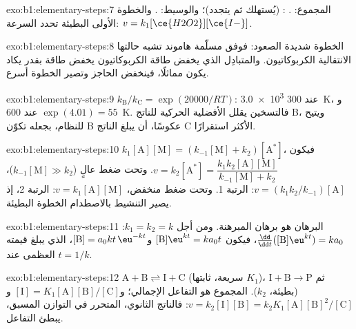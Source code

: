 \begin{solution}{exo:b1:elementary-steps:7}
المجموع: . :  (يُستهلك ثم
يتجدد)؛ والوسيط: . والخطوة الأولى البطيئة تحدد
السرعة: $v = k_1[\ce{H2O2}][\ce{I-}]$.
\end{solution}

\begin{solution}{exo:b1:elementary-steps:8}
الخطوة شديدة الصعود: فوفق مسلّمة هاموند تشبه حالتها الانتقالية
الكربوكاتيون. والمتبادِل الذي يخفض طاقة
الكربوكاتيون يخفض طاقة  بقدر يكاد يكون مماثلًا،
فينخفض الحاجز وتصير الخطوة أسرع.
\end{solution}

\begin{solution}{exo:b1:elementary-steps:9}
$k_{\mathrm B}/k_{\mathrm C} = \exp(20000/RT)$: \num{3.0e3} عند \qty{300}{K}،
و$\exp(4.01) = 55$ عند \qty{600}{K}. فالتسخين يقلل الأفضلية الحركية
للناتج B، ويتيح للنظام، بجعله تكوّن B عكوسًا، أن يبلغ
الناتج C الأكثر استقرارًا.
\end{solution}

\begin{solution}{exo:b1:elementary-steps:10}
$k_1[\mathrm{A}][\mathrm{M}] = (k_{-1}[\mathrm{M}] + k_2)[\mathrm{A}^*]$،
فيكون $v = k_2[\mathrm{A}^*] = \dfrac{k_1k_2[\mathrm{A}][\mathrm{M}]}{k_{-1}[\mathrm{M}]
+ k_2}$. وتحت ضغط عالٍ ($k_{-1}[\mathrm{M}] \gg k_2$)، $v =
(k_1k_2/k_{-1})[\mathrm{A}]$: الرتبة 1. وتحت ضغط منخفض، $v =
k_1[\mathrm{A}][\mathrm{M}]$: الرتبة 2، إذ يصير التنشيط بالاصطدام
الخطوة البطيئة.
\end{solution}

\begin{solution}{exo:b1:elementary-steps:11}
البرهان هو برهان المبرهنة. ومن أجل $k_1 = k_2 = k$:
$\frac{\dd}{\dd t}([\mathrm{B}]\eu^{kt}) = ka_0$، فيكون $[\mathrm{B}]\eu^{kt} =
ka_0t$ و$[\mathrm{B}] = a_0kt\,\eu^{-kt}$، الذي يبلغ قيمته العظمى عند $t = 1/k$.
\end{solution}

\begin{solution}{exo:b1:elementary-steps:12}
$\mathrm{A} + \mathrm{B} \rightleftharpoons \mathrm{I} + \mathrm{C}$ (سريعة،
ثابتها $K_1$)، ثم $\mathrm{I} + \mathrm{B} \to \mathrm{P}$ (بطيئة،
$k_2$). المجموع هو التفاعل الإجمالي؛ و$[\mathrm{I}] =
K_1[\mathrm{A}][\mathrm{B}]/[\mathrm{C}]$ و$v = k_2[\mathrm{I}][\mathrm{B}]
= k_2K_1[\mathrm{A}][\mathrm{B}]^2/[\mathrm{C}]$: فالناتج الثانوي، المتحرر
في التوازن المسبق، يبطئ التفاعل.
\end{solution}

